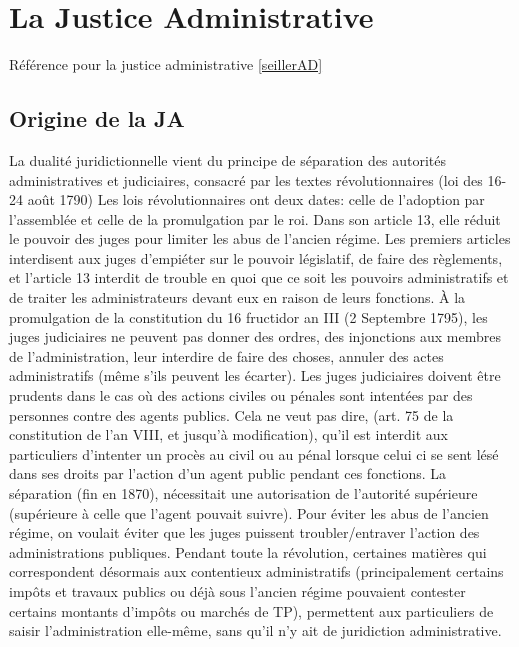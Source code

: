\documentclass[math]{cours}
\begin{document}
\section{La Justice Administrative}
Référence pour la justice administrative \ref{seillerAD}

\subsection{Origine de la JA}
La dualité juridictionnelle vient du principe de séparation des autorités administratives et judiciaires, consacré par les textes révolutionnaires (loi des 16-24 août 1790)
Les lois révolutionnaires ont deux dates: celle de l'adoption par l'assemblée et celle de la promulgation par le roi.
Dans son article 13, elle réduit le pouvoir des juges pour limiter les abus de l'ancien régime.
Les premiers articles interdisent aux juges d'empiéter sur le pouvoir législatif, de faire des règlements, et l'article 13 interdit de trouble en quoi que ce soit les pouvoirs administratifs et de traiter les administrateurs devant eux en raison de leurs fonctions.
À la promulgation de la constitution du 16 fructidor an III (2 Septembre 1795), les juges judiciaires ne peuvent pas donner des ordres, des injonctions aux membres de l'administration, leur interdire de faire des choses, annuler des actes administratifs (même s'ils peuvent les écarter).
Les juges judiciaires doivent être prudents dans le cas où des actions civiles ou pénales sont intentées par des personnes contre des agents publics.
Cela ne veut pas dire, (art. 75 de la constitution de l'an VIII, et jusqu'à modification), qu'il est interdit aux particuliers d'intenter un procès au civil ou au pénal lorsque celui ci se sent lésé dans ses droits par l'action d'un agent public pendant ces fonctions.
La séparation (fin en 1870), nécessitait une autorisation de l'autorité supérieure (supérieure à celle que l'agent pouvait suivre).
Pour éviter les abus de l'ancien régime, on voulait éviter que les juges puissent troubler/entraver l'action des administrations publiques.
Pendant toute la révolution, certaines matières qui correspondent désormais aux contentieux administratifs (principalement certains impôts et travaux publics ou déjà sous l'ancien régime pouvaient contester certains montants d'impôts ou marchés de TP), permettent aux particuliers de saisir l'administration elle-même, sans qu'il n'y ait de juridiction administrative.
\end{document}
